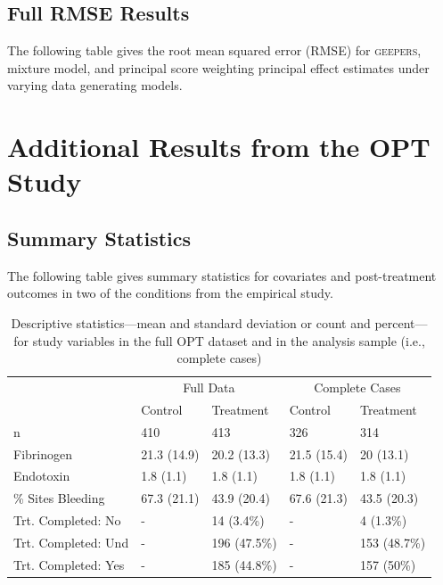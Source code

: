 \documentclass[]{article}
\begin{document}



\clearpage
\subsection{Full RMSE Results}
The following table gives the root mean squared error (RMSE) for \textsc{geepers}, mixture model, and principal score weighting principal effect estimates under varying data generating models.\\



\clearpage


\section{Additional Results from the OPT Study}
\singlespacing
\subsection{Summary Statistics}
The following table gives summary statistics for covariates and post-treatment outcomes in two of the conditions from the empirical study.\\

\begin{table}

\caption{\label{tab:optTab1}Descriptive statistics---mean and standard deviation or count and percent---for study variables in the full OPT dataset and in the analysis sample (i.e., complete cases)}
\centering
\begin{tabular}[t]{lllll}
\toprule
\multicolumn{1}{c}{ } & \multicolumn{2}{c}{Full Data} & \multicolumn{2}{c}{Complete Cases} \\
\cmidrule(l{3pt}r{3pt}){2-3} \cmidrule(l{3pt}r{3pt}){4-5}
  & Control & Treatment & Control & Treatment\\
\midrule
n & 410 & 413 & 326 & 314\\
Fibrinogen & 21.3 (14.9) & 20.2 (13.3) & 21.5 (15.4) & 20 (13.1)\\
Endotoxin & 1.8 (1.1) & 1.8 (1.1) & 1.8 (1.1) & 1.8 (1.1)\\
\% Sites Bleeding & 67.3 (21.1) & 43.9 (20.4) & 67.6 (21.3) & 43.5 (20.3)\\
Trt. Completed: No & - & 14 (3.4\%) & - & 4 (1.3\%)\\
\addlinespace
Trt. Completed: Und & - & 196 (47.5\%) & - & 153 (48.7\%)\\
Trt. Completed: Yes & - & 185 (44.8\%) & - & 157 (50\%)\\
\bottomrule
\end{tabular}
\end{table}
\end{document}
